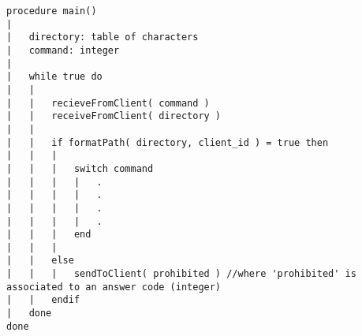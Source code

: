 \begin{lstlisting}
procedure main()
|
|	directory: table of characters
|	command: integer
|	
|	while true do
|	|
|	|	recieveFromClient( command )
|	|	receiveFromClient( directory )
|	|	
|	|	if formatPath( directory, client_id ) = true then
|	|	|
|	|	|	switch command
|	|	|	|	.
|	|	|	|	.
|	|	|	|	.
|	|	|	|	.
|	|	|	end
|	|	|
|	|	else
|	|	|	sendToClient( prohibited ) //where 'prohibited' is associated to an answer code (integer)
|	|	endif
|	done
done
\end{lstlisting}